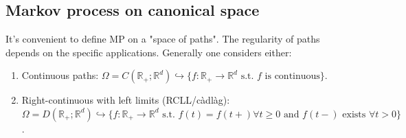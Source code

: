 \subsection*{Markov process on canonical space}

It's convenient to define MP on a "space of paths". The regularity of paths depends on the specific applications. Generally one considers either:
\begin{enumerate}
    \item[(a)] Continuous paths: $\Omega = C(\mathbb{R}_+; \mathbb{R}^d) \hookrightarrow \{f: \mathbb{R}_+ \to \mathbb{R}^d \text{ s.t. } f \text{ is continuous}\}$.
    \item[(b)] Right-continuous with left limits (RCLL/càdlàg): $\Omega = D(\mathbb{R}_+; \mathbb{R}^d) \hookrightarrow \{f: \mathbb{R}_+ \to \mathbb{R}^d \text{ s.t. } f(t) = f(t+) \forall t \ge 0 \text{ and } f(t-) \text{ exists } \forall t > 0\}$.
\end{enumerate}

